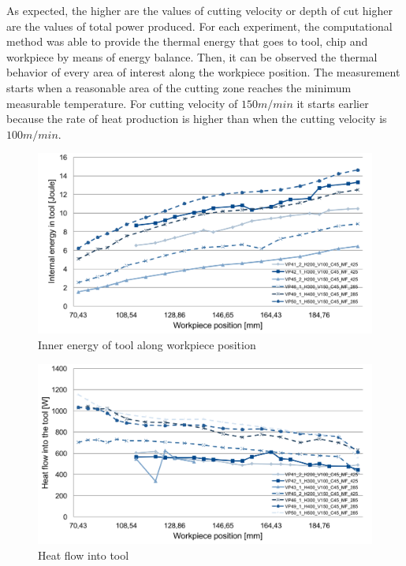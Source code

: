 		As expected, the higher are the values of cutting velocity or depth of cut higher are the values of total power produced.
		For each experiment, the computational method was able to provide the thermal energy that goes to tool, chip and workpiece by means of energy balance. Then, it can be observed the thermal behavior of every area of interest along the workpiece position. The measurement starts when a reasonable area of the cutting zone reaches the minimum measurable temperature. For cutting velocity of $150 m/min$ it starts earlier because the rate of heat production is higher than when the cutting velocity is $100 m/min$.

		\begin{figure}[H]
			\centering
			\captionsetup{justification=centering}
			\includegraphics[scale=0.55]{Imagens/Inner_Energy.png}
			\caption{Inner energy of tool along workpiece position}
			\label{fig:innerTool}
		\end{figure}

		\begin{figure}[H]
			\centering
			\captionsetup{justification=centering}
			\includegraphics[scale=0.55]{Imagens/energyTool2.png}
			\caption{Heat flow into tool}
			\label{fig:hflowTool}
		\end{figure}

